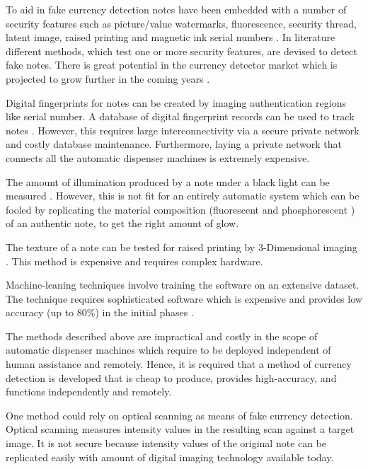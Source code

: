 \documentclass{article}
\begin{document}
To aid in fake currency detection notes have been embedded with a number of security features such as picture/value watermarks, fluorescence, security thread, latent image, raised printing and magnetic ink serial numbers \cite{ScaleUp_MLSP:3}. In literature different methods, which test one or more security features, are devised to detect fake notes. There is great potential in the currency detector market which is projected to grow further in the coming years \cite{ScaleUp_MLSP:4}.

Digital fingerprints for notes can be created by imaging authentication regions like serial number. A database of digital fingerprint records can be used to track notes \cite{ScaleUp_MLSP:5, ScaleUp_MLSP:6}. However, this requires large interconnectivity via a secure private network and costly database maintenance. Furthermore, laying a private network that connects all the automatic dispenser machines is extremely expensive.

The amount of illumination produced by a note under a black light can be measured \cite{ScaleUp_MLSP:7, ScaleUp_MLSP:8}. However, this is not fit for an entirely automatic system which can be fooled by replicating the material composition (fluorescent and phosphorescent \cite{ScaleUp_MLSP:7}) of an authentic note, to get the right amount of glow.

The texture of a note can be tested for raised printing by 3-Dimensional imaging \cite{ScaleUp_MLSP:9, ScaleUp_MLSP:10}. This method is expensive and requires complex hardware.

Machine-leaning techniques involve training the software on an extensive dataset. The technique requires sophisticated software which is expensive and provides low accuracy (up to 80\%) in the initial phases \cite{ScaleUp_MLSP:11}.

The methods described above are impractical and costly in the scope of automatic dispenser machines which require to be deployed independent of human assistance and remotely. Hence, it is required that a method of currency detection is developed that is cheap to produce, provides high-accuracy, and functions independently and remotely.

One method could rely on optical scanning as means of fake currency detection. Optical scanning measures intensity values in the resulting scan against a target image. It is not secure because intensity values of the original note can be replicated easily with amount of digital imaging technology available today.
\end{document}
